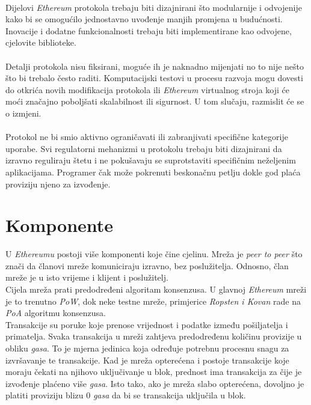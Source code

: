 \documentclass[times, utf8, zavrsni, numeric]{fer}
\begin{document}
\paragraph{}
Dijelovi \emph{Ethereum} protokola trebaju biti dizajnirani što modularnije i odvojenije kako bi se omogućilo jednostavno uvođenje manjih promjena u budućnosti. Inovacije
i dodatne funkcionalnosti trebaju biti implementirane kao odvojene, cjelovite biblioteke.
\paragraph{}
Detalji protokola nisu fiksirani, moguće ih je naknadno mijenjati no to nije nešto što bi trebalo često raditi. Komputacijski testovi u procesu razvoja mogu dovesti do
otkrića novih modifikacija protokola ili \emph{Ethereum} virtualnog stroja  koji će moći značajno poboljšati skalabilnost ili sigurnost.
U tom slučaju, razmislit će se o izmjeni.
\paragraph{}
Protokol ne bi smio aktivno ograničavati ili zabranjivati specifične kategorije uporabe. Svi regulatorni mehanizmi u protokolu trebaju biti dizajnirani da izravno
reguliraju štetu i ne pokušavaju se suprotstaviti specifičnim neželjenim aplikacijama. Programer čak može pokrenuti beskonačnu petlju dokle god plaća proviziju
njeno za izvođenje.\citep{whitepaper}

\section{Komponente}
U \emph{Ethereumu} postoji više komponenti koje čine cjelinu. Mreža je \emph{peer to peer} što znači da članovi mreže komuniciraju izravno, bez poslužitelja.
Odnosno, član mreže je u isto vrijeme i klijent i poslužitelj. \\
Cijela mreža prati predodređeni algoritam konsenzusa. U glavnoj \emph{Ethereum} mreži je to trenutno \emph{PoW}, dok neke testne mreže, primjerice \emph{Ropsten i Kovan} 
rade na \emph{PoA} algoritmu konsenzusa. \\
Transakcije su poruke koje prenose vrijednost i podatke između pošiljatelja i primatelja. Svaka transakcija u mreži zahtjeva predodređenu količinu provizije u obliku
\emph{gasa}. To je mjerna jedinica koja određuje potrebnu procesnu snagu za izvršavanje te transakcije.
Kad je mreža opterećena i postoje transakcije koje moraju čekati na njihovo uključivanje u blok, prednost ima transakcija za čije je izvođenje plaćeno više
\emph{gasa}. Isto tako, ako je mreža slabo opterećena, dovoljno je platiti proviziju blizu 0 \emph{gasa} da bi se transakcija uključila u blok.\citep{ethdocs}
\end{document}

